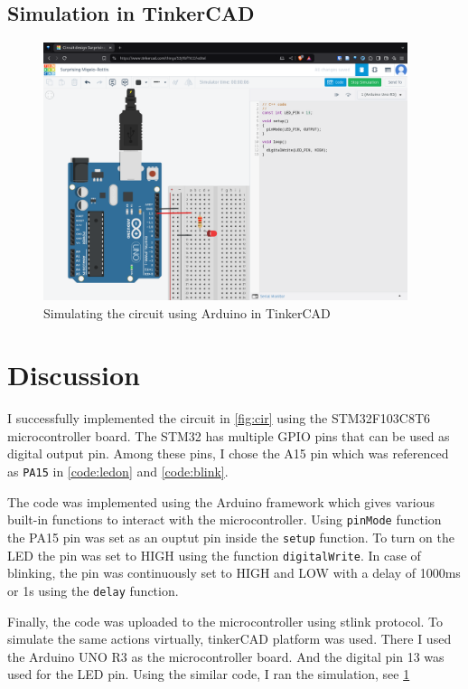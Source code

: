 \subsection{Simulation in TinkerCAD}
\begin{figure}[ht]
    \centering
    \includegraphics[width=0.95\textwidth]{img/tinkercad.png}
    \caption{Simulating the circuit using Arduino in TinkerCAD}\label{fig:sim}
\end{figure}
\section{Discussion}
I successfully implemented the circuit in \cref{fig:cir} using 
the STM32F103C8T6 microcontroller board. The STM32 has multiple GPIO pins that
can be used as digital output pin. Among these pins, I chose the A15 pin which was referenced as \texttt{PA15} in \cref{code:ledon} and \cref{code:blink}.

The code was implemented using the Arduino framework which gives various 
built-in functions to interact with the microcontroller. Using \texttt{pinMode}
function the PA15 pin was set as an ouptut pin inside the \texttt{setup} function. 
To turn on the LED the pin was set to HIGH using the function \texttt{digitalWrite}.
In case of blinking, the pin was continuously set to HIGH and LOW with a
delay of 1000ms or 1s using the \texttt{delay} function.

Finally, the code was uploaded to the microcontroller using stlink protocol.
To simulate the same actions virtually, tinkerCAD platform was used. There I 
used the Arduino UNO R3 as the microcontroller board. And the digital pin 13 
was used for the LED pin. Using the similar code, I ran the simulation, see \cref{fig:sim}
